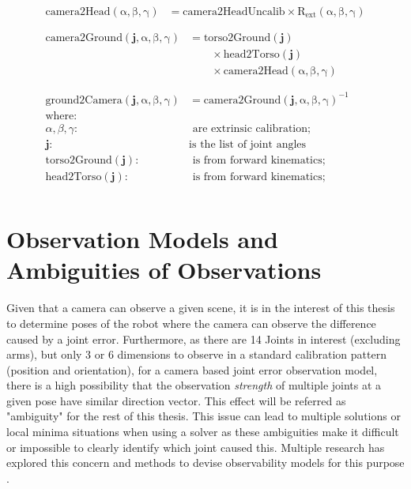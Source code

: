 \documentclass[english, printversion, nomenclature, notitle]{tuvisionthesis} %
\begin{document}
\begin{align}
\begin{split}
	\label{eq:camera2Head}
	\operatorname{camera2Head(\alpha, \beta, \gamma)} &= \mathrm{camera2HeadUncalib} \times \operatorname{R_\mathrm{ext}(\alpha, \beta, \gamma)} \\
\end{split}\\
\begin{split}
	\operatorname{camera2Ground(\mathbf{j}, \alpha, \beta, \gamma)} &= \operatorname{torso2Ground(\mathbf{j})}
	\nonumber\\
	&\qquad
	{} \times \operatorname{head2Torso(\mathbf{j})}
	\nonumber\\
	&\qquad
	{} \times \operatorname{camera2Head(\alpha, \beta, \gamma)} \\
\end{split}\\
\begin{split}
	\label{eq:ground2Camera}
	\operatorname{ground2Camera(\mathbf{j}, \alpha, \beta, \gamma)} &= \operatorname{camera2Ground(\mathbf{j}, \alpha, \beta, \gamma)}^{-1}\\
	\text{where:}&\\
	\alpha, \beta,\gamma : & \text{ are extrinsic calibration};\\
	\mathbf{j} : & \text{is the list of joint angles}\\
	\operatorname{torso2Ground(\mathbf{j})} : & \text{ is from forward kinematics};\\
	\operatorname{head2Torso(\mathbf{j})} : & \text{ is from forward kinematics};\\
\end{split}
\end{align}

\section{Observation Models and Ambiguities of Observations}
\label{subsec:ambiguities}

Given that a camera can observe a given scene, it is in the interest of this thesis to determine poses of the robot where the camera can observe the difference caused by a joint error. Furthermore, as there are 14 Joints in interest (excluding arms), but only 3 or 6 dimensions to observe in a standard calibration pattern (position and orientation), for a camera based joint error observation model, there is a high possibility that the observation \textit{strength} of multiple joints at a given pose have similar direction vector. This effect will be referred as "ambiguity" for the rest of this thesis. This issue can lead to multiple solutions or local minima situations when using a solver as these ambiguities make it difficult or impossible to clearly identify which joint caused this. Multiple research has explored this concern and methods to devise observability models for this purpose \cite{borm_experimental_nodate, 503848}. 
\end{document}
